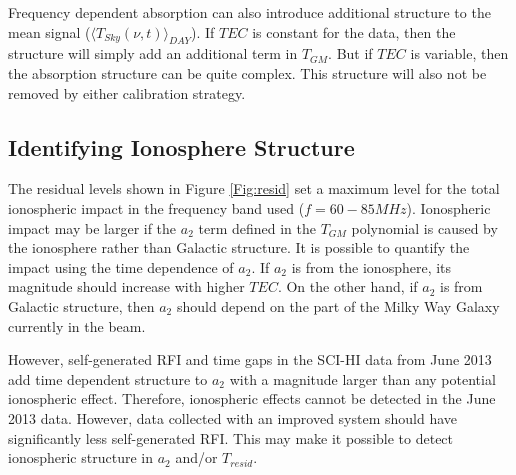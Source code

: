 Frequency dependent absorption can also introduce additional structure to the mean signal ($\langle T_{Sky}(\nu,t) \rangle_{DAY}$). If $TEC$ is constant for the data, then the structure will simply add an additional term in $T_{GM}$. But if $TEC$ is variable, then the absorption structure can be quite complex.  This structure will also not be removed by either calibration strategy. 


\subsection{Identifying Ionosphere Structure}

The residual levels shown in Figure \ref{Fig:resid} set a maximum level for the total ionospheric impact in the frequency band used ($f=60-85 MHz$).  Ionospheric impact may be larger if the $a_2$ term defined in the $T_{GM}$ polynomial is caused by the ionosphere rather than Galactic structure. It is possible to quantify the impact using the time dependence of $a_2$. If $a_2$ is from the ionosphere, its magnitude should increase with higher $TEC$. On the other hand, if $a_2$ is from Galactic structure, then $a_2$ should depend on the part of the Milky Way Galaxy currently in the beam. 

However, self-generated RFI and time gaps in the SCI-HI data from June 2013 add time dependent structure to $a_2$ with a magnitude larger than any potential ionospheric effect. Therefore, ionospheric effects cannot be detected in the June 2013 data. However, data collected with an improved system should have significantly less self-generated RFI. This may make it possible to detect ionospheric structure in $a_2$ and/or $T_{resid}$. 